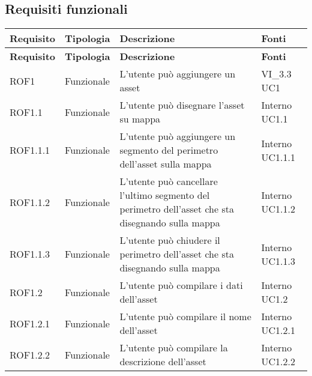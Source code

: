 \subsection{Requisiti funzionali}
\def\arraystretch{1.5}
\begin{longtable}{p{2cm}!{\VRule[1pt]}p{2cm}!{\VRule[1pt]}p{5cm}!{\VRule[1pt]}p{1.5cm}}
\color{white} \textbf{Requisito} & \color{white} \textbf{Tipologia} & \color{white} \textbf{Descrizione} & \color{white} \textbf{Fonti} \\
\endfirsthead
{}
\color{white} \textbf{Requisito} & \color{white} \textbf{Tipologia} & \color{white} \textbf{Descrizione} & \color{white} \textbf{Fonti} \\
\endhead
ROF1&Funzionale\newline  & L'utente può aggiungere un asset & VI_3.3 \newline UC1
 \\
ROF1.1&Funzionale\newline  & L'utente può disegnare l'asset su mappa & Interno \newline UC1.1
 \\
ROF1.1.1&Funzionale\newline  & L'utente può aggiungere un segmento del perimetro dell'asset sulla mappa & Interno \newline UC1.1.1
 \\
ROF1.1.2&Funzionale\newline  & L'utente può cancellare l'ultimo segmento del perimetro dell'asset che sta disegnando sulla mappa & Interno \newline UC1.1.2
 \\
ROF1.1.3&Funzionale\newline  & L'utente può chiudere il perimetro dell'asset che sta disegnando sulla mappa & Interno \newline UC1.1.3
 \\
ROF1.2&Funzionale\newline  & L'utente può compilare i dati dell'asset & Interno \newline UC1.2
 \\
ROF1.2.1&Funzionale\newline  & L'utente può compilare il nome dell'asset & Interno \newline UC1.2.1
 \\
ROF1.2.2&Funzionale\newline  & L'utente può compilare la descrizione dell'asset & Interno \newline UC1.2.2

\end{longtable}
